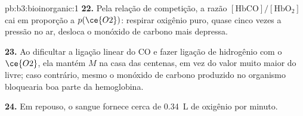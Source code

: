 \begin{solution}{pb:b3:bioinorganic:1}
\textbf{22.} Pela relação de competição, a razão $[\mathrm{HbCO}]/[\mathrm{HbO_2}]$ cai em proporção a $p(\ce{O2})$:
respirar oxigênio puro, quase cinco vezes a pressão no ar, desloca o monóxido
de carbono mais depressa.

\textbf{23.} Ao dificultar a ligação linear do CO e fazer ligação de hidrogênio com o $\ce{O2}$, ela mantém $M$ na
casa das centenas, em vez do valor muito maior do  livre; caso contrário, mesmo o
monóxido de carbono produzido no organismo bloquearia boa parte da hemoglobina.

\textbf{24.} Em repouso, o sangue fornece cerca de \qty{0.34}{L} de oxigênio por minuto.
\end{solution}
